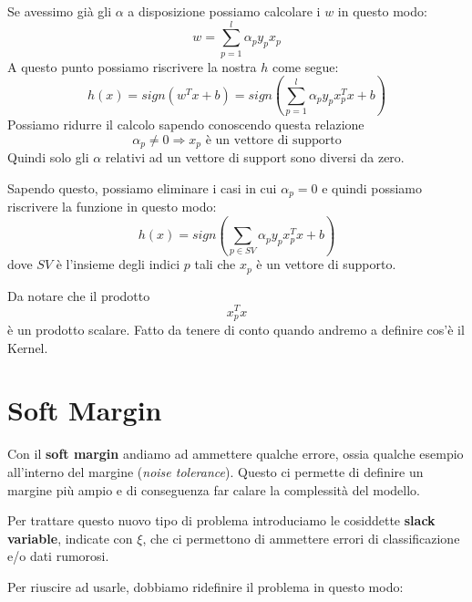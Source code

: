 Se avessimo gi\`a gli $\alpha$ a disposizione possiamo calcolare i $w$ in questo modo:
\[ w = \sum_{p=1}^l \alpha_p y_p x_p \]
A questo punto possiamo riscrivere la nostra $h$ come segue:
\[ h(x) = sign(w^T x + b) = sign \left( \sum_{p=1}^l \alpha_p y_p x_p^T x + b \right) \]
Possiamo ridurre il calcolo sapendo conoscendo questa relazione
\[ \alpha_p \neq 0 \Rightarrow x_p \text{ \`e un vettore di supporto} \]
Quindi solo gli $\alpha$ relativi ad un vettore di support sono diversi da zero.

Sapendo questo, possiamo eliminare i casi in cui $\alpha_p = 0$ e quindi possiamo riscrivere la funzione in questo modo:
\[ h(x) = sign \left( \sum_{p \in SV} \alpha_p y_p x_p^T x + b \right) \]
dove $SV$ \`e l'insieme degli indici $p$ tali che $x_p$ \`e un vettore di supporto.

Da notare che il prodotto
\[ x_p^T x \]
\`e un prodotto scalare. Fatto da tenere di conto quando andremo a definire cos'\`e il Kernel.

\section{Soft Margin}
Con il \textbf{soft margin} andiamo ad ammettere qualche errore, ossia qualche esempio all'interno del margine 
(\emph{noise tolerance}). Questo ci permette di definire un margine pi\`u ampio e di conseguenza far calare la complessit\`a
del modello.

Per trattare questo nuovo tipo di problema introduciamo le cosiddette \textbf{slack variable}, indicate con $\xi$, che ci
permettono di ammettere errori di classificazione e/o dati rumorosi.

Per riuscire ad usarle, dobbiamo ridefinire il problema in questo modo: